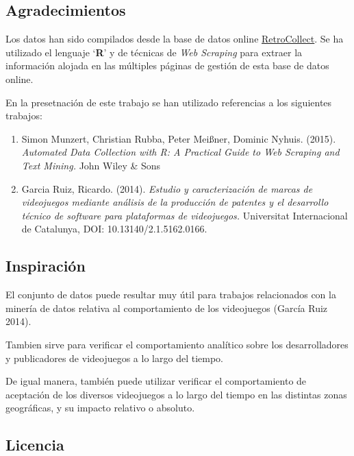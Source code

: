 \documentclass[]{article}
\providecommand{\tightlist}{%
  \setlength{\itemsep}{0pt}\setlength{\parskip}{0pt}}
\begin{document}
\clearpage

\subsection{Agradecimientos}\label{agradecimientos}

Los datos han sido compilados desde la base de datos online
\href{http://www.retrocollect.com/}{RetroCollect}. Se ha utilizado el
lenguaje `\textbf{R}' y de técnicas de \emph{Web Scraping} para extraer
la información alojada en las múltiples páginas de gestión de esta base
de datos online.

En la presetnación de este trabajo se han utilizado referencias a los
siguientes trabajos:

\begin{enumerate}
\def\labelenumi{\arabic{enumi}.}
\tightlist
\item
  Simon Munzert, Christian Rubba, Peter Meißner, Dominic Nyhuis. (2015).
  \emph{Automated Data Collection with R: A Practical Guide to Web
  Scraping and Text Mining.} John Wiley \& Sons
\item
  Garcia Ruiz, Ricardo. (2014). \emph{Estudio y caracterización de
  marcas de videojuegos mediante análisis de la producción de patentes y
  el desarrollo técnico de software para plataformas de videojuegos.}
  Universitat Internacional de Catalunya, DOI: 10.13140/2.1.5162.0166.
\end{enumerate}

\subsection{Inspiración}\label{inspiracion}

El conjunto de datos puede resultar muy útil para trabajos relacionados
con la minería de datos relativa al comportamiento de los videojuegos
(García Ruiz 2014).

Tambien sirve para verificar el comportamiento analítico sobre los
desarrolladores y publicadores de videojuegos a lo largo del tiempo.

De igual manera, también puede utilizar verificar el comportamiento de
aceptación de los diversos videojuegos a lo largo del tiempo en las
distintas zonas geográficas, y su impacto relativo o absoluto.

\subsection{Licencia}\label{licencia}
\end{document}

